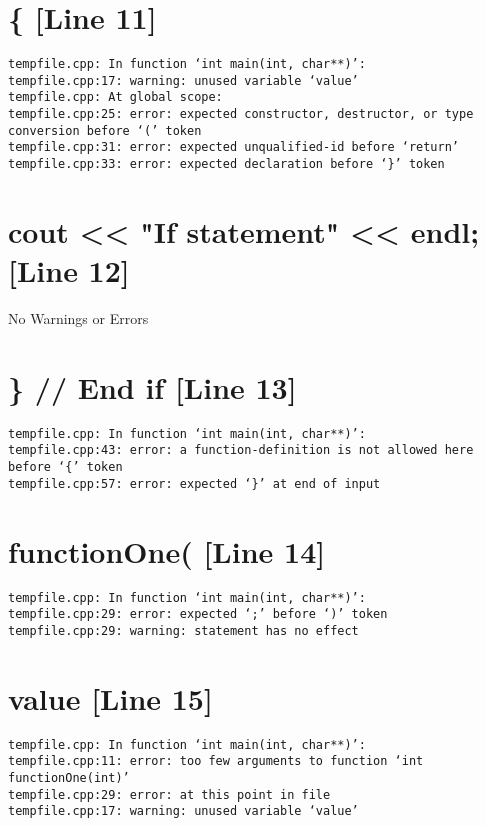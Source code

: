 \documentclass{article}
\begin{document}
\section{\{ [Line 11]}
\begin{verbatim}
tempfile.cpp: In function ‘int main(int, char**)’:
tempfile.cpp:17: warning: unused variable ‘value’
tempfile.cpp: At global scope:
tempfile.cpp:25: error: expected constructor, destructor, or type conversion before ‘(’ token
tempfile.cpp:31: error: expected unqualified-id before ‘return’
tempfile.cpp:33: error: expected declaration before ‘}’ token

\end{verbatim}



\section{cout << "If statement" << endl; [Line 12]}
No Warnings or Errors



\section{\} // End if [Line 13]}
\begin{verbatim}
tempfile.cpp: In function ‘int main(int, char**)’:
tempfile.cpp:43: error: a function-definition is not allowed here before ‘{’ token
tempfile.cpp:57: error: expected ‘}’ at end of input

\end{verbatim}



\section{functionOne( [Line 14]}
\begin{verbatim}
tempfile.cpp: In function ‘int main(int, char**)’:
tempfile.cpp:29: error: expected ‘;’ before ‘)’ token
tempfile.cpp:29: warning: statement has no effect

\end{verbatim}



\section{value [Line 15]}
\begin{verbatim}
tempfile.cpp: In function ‘int main(int, char**)’:
tempfile.cpp:11: error: too few arguments to function ‘int functionOne(int)’
tempfile.cpp:29: error: at this point in file
tempfile.cpp:17: warning: unused variable ‘value’

\end{verbatim}
\end{document}
